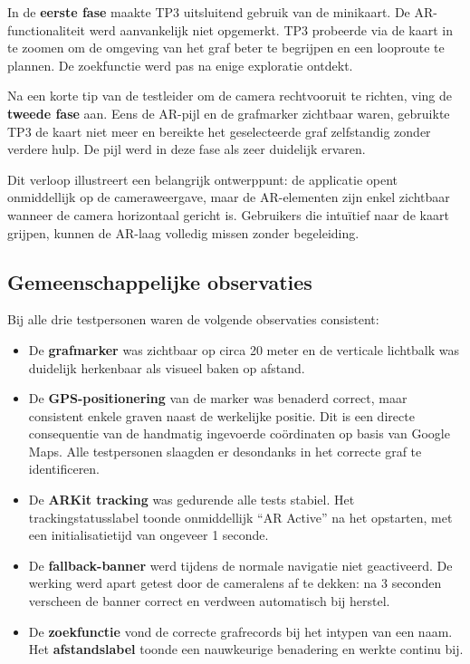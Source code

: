 In de \textbf{eerste fase} maakte TP3 uitsluitend gebruik van de minikaart.
De AR-functionaliteit werd aanvankelijk niet opgemerkt. TP3 probeerde via de
kaart in te zoomen om de omgeving van het graf beter te begrijpen en een
looproute te plannen. De zoekfunctie werd pas na enige exploratie ontdekt.

Na een korte tip van de testleider om de camera rechtvooruit te richten, ving
de \textbf{tweede fase} aan. Eens de AR-pijl en de grafmarker zichtbaar waren,
gebruikte TP3 de kaart niet meer en bereikte het geselecteerde graf zelfstandig
zonder verdere hulp. De pijl werd in deze fase als zeer duidelijk ervaren.

Dit verloop illustreert een belangrijk ontwerppunt: de applicatie opent
onmiddellijk op de cameraweergave, maar de AR-elementen zijn enkel zichtbaar
wanneer de camera horizontaal gericht is. Gebruikers die intuïtief naar de kaart
grijpen, kunnen de AR-laag volledig missen zonder begeleiding.

\subsection{Gemeenschappelijke observaties}

Bij alle drie testpersonen waren de volgende observaties consistent:

\begin{itemize}
    \item De \textbf{grafmarker} was zichtbaar op circa 20 meter en de verticale
    lichtbalk was duidelijk herkenbaar als visueel baken op afstand.
    \item De \textbf{GPS-positionering} van de marker was benaderd correct, maar
    consistent enkele graven naast de werkelijke positie. Dit is een directe
    consequentie van de handmatig ingevoerde coördinaten op basis van Google Maps.
    Alle testpersonen slaagden er desondanks in het correcte graf te identificeren.
    \item De \textbf{ARKit tracking} was gedurende alle tests stabiel. Het
    trackingstatusslabel toonde onmiddellijk ``AR Active'' na het opstarten,
    met een initialisatietijd van ongeveer 1 seconde.
    \item De \textbf{fallback-banner} werd tijdens de normale navigatie niet
    geactiveerd. De werking werd apart getest door de cameralens af te dekken:
    na 3 seconden verscheen de banner correct en verdween automatisch bij herstel.
    \item De \textbf{zoekfunctie} vond de correcte grafrecords bij het intypen
    van een naam. Het \textbf{afstandslabel} toonde een nauwkeurige benadering
    en werkte continu bij.
\end{itemize}

